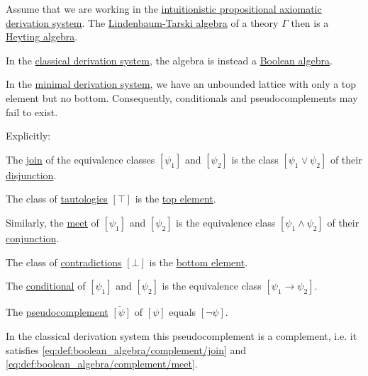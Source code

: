 \begin{proposition}\label{thm:intuitionistic_lindenbaum_tarski_algebra}
  Assume that we are working in the \hyperref[def:intuitionistic_propositional_axiomatic_derivation_system]{intuitionistic propositional axiomatic derivation system}. The \hyperref[def:lindenbaum_tarski_algebra]{Lindenbaum-Tarski algebra} of a theory \( \Gamma \) then is a \hyperref[def:heyting_algebra]{Heyting algebra}.

  In the \hyperref[def:propositional_axiomatic_derivation_system]{classical derivation system}, the algebra is instead a \hyperref[def:boolean_algebra]{Boolean algebra}.

  In the \hyperref[def:minimal_propositional_axiomatic_derivation_system]{minimal derivation system}, we have an unbounded lattice with only a top element but no bottom. Consequently, conditionals and pseudocomplements may fail to exist.

  Explicitly:
  \begin{thmenum}
     The \hyperref[def:semilattice/join]{join} of the equivalence classes \( [\psi_1] \) and \( [\psi_2] \) is the class \( [\psi_1 \vee \psi_2] \) of their \hyperref[def:propositional_language/connectives/disjunction]{disjunction}.

     The class of \hyperref[def:propositional_semantics/tautology]{tautologies} \( [\top] \) is the \hyperref[def:poset_extremal_points/top_and_bottom]{top element}.

     Similarly, the \hyperref[def:semilattice/meet]{meet} of \( [\psi_1] \) and \( [\psi_2] \) is the equivalence class \( [\psi_1 \wedge \psi_2] \) of their \hyperref[def:propositional_language/connectives/conjunction]{conjunction}.

     The class of \hyperref[def:propositional_semantics/contradiction]{contradictions} \( [\bot] \) is the \hyperref[def:poset_extremal_points/top_and_bottom]{bottom element}.

     The \hyperref[eq:def:heyting_algebra/conditional]{conditional} of \( [\psi_1] \) and \( [\psi_2] \) is the equivalence class \( [\psi_1 \rightarrow \psi_2] \).

     The \hyperref[eq:def:heyting_algebra/pseudocomplement]{pseudocomplement} \( \widetilde{[\psi]} \) of \( [\psi] \) equals \( [\neg \psi] \).

    In the classical derivation system this pseudocomplement is a complement, i.e. it satisfies \eqref{eq:def:boolean_algebra/complement/join} and \eqref{eq:def:boolean_algebra/complement/meet}.
  \end{thmenum}
\end{proposition}
